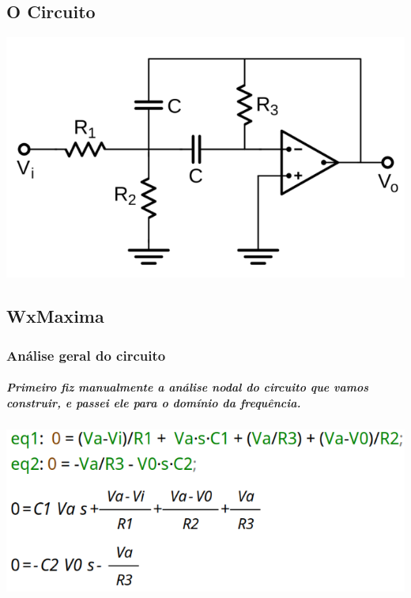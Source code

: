 \documentclass[12pt,twoside, a4paper, twocolumn]{article}
\begin{document}
\subsection{O Circuito}
\begin{adjustbox}{scale=0.30}
    \includegraphics{AnaliseNodal.png}
\end{adjustbox}
\newpage
\subsection{WxMaxima}


\subsubsection{Análise geral do circuito}




\subparagraph*{Primeiro fiz manualmente a análise nodal do circuito que vamos construir, e passei ele para o domínio da frequência.}
\subparagraph*{}




\begin{adjustbox}{scale=0.4}
    \includegraphics{eqs.png}
\end{adjustbox}
\end{document}
